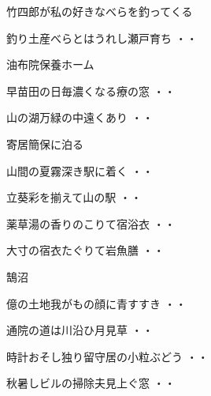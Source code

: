 \vspace{0.6cm}
竹四郎が私の好きなべらを釣ってくる
\begin{shiika}釣り土産べらとはうれし瀬戸育ち
\hfill{・・}\end{shiika}
\vspace{0.6cm}
油布院保養ホーム
\begin{shiika}早苗田の日毎濃くなる療の窓
\hfill{・・}\end{shiika}
\begin{shiika}山の湖万緑の中遠くあり
\hfill{・・}\end{shiika}
\vspace{0.6cm}
寄居簡保に泊る
\begin{shiika}山間の夏霧深き駅に着く
\hfill{・・}\end{shiika}
\vspace{0.6cm}
\begin{shiika}立葵彩を揃えて山の駅
\hfill{・・}\end{shiika}
\vspace{0.6cm}
\begin{shiika}薬草湯の香りのこりて宿浴衣
\hfill{・・}\end{shiika}
\vspace{0.6cm}
\begin{shiika}大寸の宿衣たぐりて岩魚膳
\hfill{・・}\end{shiika}
\vspace{0.6cm}
鵠沼
\begin{shiika}億の土地我がもの顔に青すすき
\hfill{・・}\end{shiika}
\vspace{0.6cm}
\begin{shiika}通院の道は川沿ひ月見草
\hfill{・・}\end{shiika}
\vspace{0.6cm}
\begin{shiika}時計おそし独り留守居の小粒ぶどう
\hfill{・・}\end{shiika}
\vspace{0.6cm}
\begin{shiika}秋暑しビルの掃除夫見上ぐ窓
\hfill{・・}\end{shiika}
